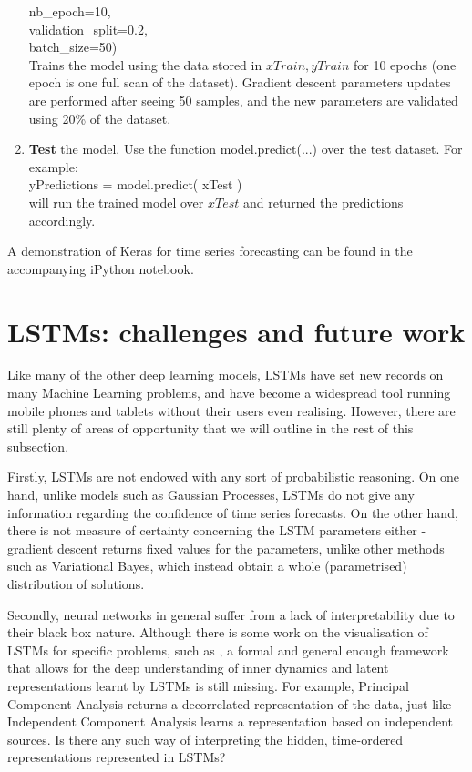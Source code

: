 \documentclass[pdftex,11pt,a4paper]{article}
\theoremstyle{definition}
\theoremstyle{remark}
\newcommand\tab[1][1cm]{\hspace*{#1}}
\begin{document}
\begin{enumerate}
          \tab nb\_epoch=10,\\
          \tab validation\_split=0.2,\\
          \tab batch\_size=50)\\
    Trains the model using the data stored in $xTrain, yTrain$ for 10 epochs (one epoch is one full scan of the dataset). Gradient descent parameters updates are performed after seeing 50 samples, and the new parameters are validated using 20\% of the dataset. 
    \item \textbf{Test} the model. Use the function model.predict(...) over the test dataset. For example:\\
    yPredictions = model.predict( xTest )\\
    will run the trained model over $xTest$ and returned the predictions accordingly.
\end{enumerate}

\par A demonstration of Keras for time series forecasting can be found in the accompanying iPython notebook.

\section{LSTMs: challenges and future work} \label{sub_future}
Like many of the other deep learning models, LSTMs have set new records on many Machine Learning problems, and have become a widespread tool running mobile phones and tablets without their users even realising. However, there are still plenty of areas of opportunity that we will outline in the rest of this subsection.

\par Firstly, LSTMs are not endowed with any sort of probabilistic reasoning. On one hand, unlike models such as Gaussian Processes, LSTMs do not give any information regarding the confidence of time series forecasts. On the other hand, there is not measure of certainty concerning the LSTM parameters either - gradient descent returns fixed values for the parameters, unlike other methods such as Variational Bayes, which instead obtain a whole (parametrised) distribution of solutions.

\par Secondly, neural networks in general suffer from a lack of interpretability due to their black box nature. Although there is some work on the visualisation of LSTMs for specific problems, such as \cite{Karpathy2016}, a formal and general enough framework that allows for the deep understanding of inner dynamics and latent representations learnt by LSTMs is still missing. For example, Principal Component Analysis returns a decorrelated representation of the data, just like Independent Component Analysis learns a representation based on independent sources. Is there any such way of interpreting the hidden, time-ordered representations represented in LSTMs?
\end{document}
